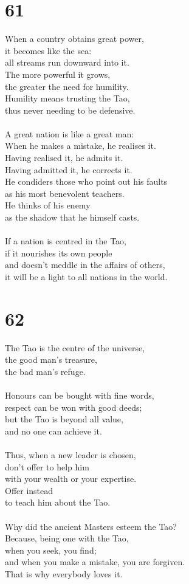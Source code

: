 \documentclass[b5paper, 12pt, oneside]{book}
\begin{document}
\chapter*{61}
When a country obtains great power,\\
it becomes like the sea:\\
all streams run downward into it.\\
The more powerful it grows,\\
the greater the need for humility.\\
Humility means trusting the Tao,\\
thus never needing to be defensive.\\
\\
A great nation is like a great man:\\
When he makes a mistake, he realises it.\\
Having realised it, he admits it.\\
Having admitted it, he corrects it.\\
He condiders those who point out his faults\\
as his most benevolent teachers.\\
He thinks of his enemy\\
as the shadow that he himself casts.\\
\\
If a nation is centred in the Tao,\\
if it nourishes its own people\\
and doesn't meddle in the affairs of others,\\
it will be a light to all nations in the world.

\chapter*{62}
The Tao is the centre of the universe,\\
the good man's treasure,\\
the bad man's refuge.\\
\\
Honours can be bought with fine words,\\
respect can be won with good deeds;\\
but the Tao is beyond all value,\\
and no one can achieve it.\\
\\
Thus, when a new leader is chosen,\\
don't offer to help him\\
with your wealth or your expertise.\\
Offer instead\\
to teach him about the Tao.\\
\\
Why did the ancient Masters esteem the Tao?\\
Because, being one with the Tao,\\
when you seek, you find;\\
and when you make a mistake, you are forgiven.\\
That is why everybody loves it.
\end{document}
